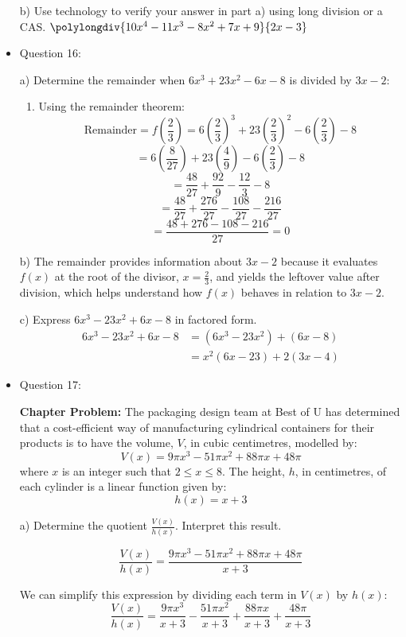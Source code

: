 \documentclass{article}
\begin{document}
\begin{itemize}
b) Use technology to verify your answer in part a) using long division or a CAS.
\(\polylongdiv{10x^4 - 11x^3 - 8x^2 + 7x + 9}{2x-3}\)
\item Question 16:

a) Determine the remainder when \(6x^3 + 23x^2 - 6x - 8\) is divided by \(3x - 2\):

\begin{enumerate}
    \item Using the remainder theorem:
    \[
    \text{Remainder} = f\left(\frac{2}{3}\right) = 6\left(\frac{2}{3}\right)^3 + 23\left(\frac{2}{3}\right)^2 - 6\left(\frac{2}{3}\right) - 8
    \]
    \[
    = 6\left(\frac{8}{27}\right) + 23\left(\frac{4}{9}\right) - 6\left(\frac{2}{3}\right) - 8
    \]
    \[
    = \frac{48}{27} + \frac{92}{9} - \frac{12}{3} - 8
    \]
    \[
    = \frac{48}{27} + \frac{276}{27} - \frac{108}{27} - \frac{216}{27}
    \]
    \[
    = \frac{48 + 276 - 108 - 216}{27} = 0
    \]
\end{enumerate}

b) The remainder provides information about \(3x - 2\) because it evaluates \(f(x)\) at the root of the divisor, \(x = \frac{2}{3}\), and yields the leftover value after division, which helps understand how \(f(x)\) behaves in relation to \(3x - 2\).

c) Express \(6x^3 - 23x^2 + 6x - 8\) in factored form.
\begin{align*}
6x^3 - 23x^2 + 6x - 8 &= (6x^3 - 23x^2) + (6x - 8) \\
&= x^2(6x - 23) + 2(3x - 4)
\end{align*}



\item Question 17:

\textbf{Chapter Problem:}
The packaging design team at Best of U has determined that a cost-efficient way of manufacturing cylindrical containers for their products is to have the volume, \(V\), in cubic centimetres, modelled by:
\[ V(x) = 9\pi x^3 - 51\pi x^2 + 88\pi x + 48\pi \]
where \(x\) is an integer such that \(2 \leq x \leq 8\). The height, \(h\), in centimetres, of each cylinder is a linear function given by:
\[ h(x) = x + 3 \]

a) Determine the quotient \(\frac{V(x)}{h(x)}\). Interpret this result.

\[
\frac{V(x)}{h(x)} = \frac{9\pi x^3 - 51\pi x^2 + 88\pi x + 48\pi}{x + 3}
\]

We can simplify this expression by dividing each term in \(V(x)\) by \(h(x)\):
\[
\frac{V(x)}{h(x)} = \frac{9\pi x^3}{x + 3} - \frac{51\pi x^2}{x + 3} + \frac{88\pi x}{x + 3} + \frac{48\pi}{x + 3}
\]


\end{itemize}
\end{document}
